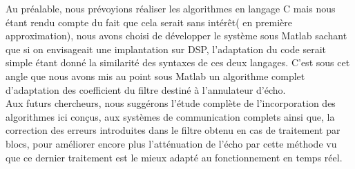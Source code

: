 Au préalable, nous prévoyions réaliser les algorithmes en langage C mais nous étant rendu compte du fait que cela serait sans intérêt( en première approximation), nous avons choisi de développer le système sous Matlab sachant que si on envisageait une implantation sur DSP, l'adaptation du code serait simple étant donné la similarité des syntaxes de ces deux langages. C'est sous cet angle que nous avons mis au point sous Matlab un algorithme complet d'adaptation des coefficient du filtre destiné à l'annulateur d'écho.\\
Aux futurs chercheurs, nous suggérons l'étude complète de l'incorporation des algorithmes ici conçus, aux systèmes de communication complets ainsi que, la correction des erreurs introduites dans le filtre obtenu en cas de traitement par blocs, pour améliorer encore plus l'atténuation de l'écho par cette méthode vu que ce dernier traitement est le mieux adapté au fonctionnement en temps réel.
